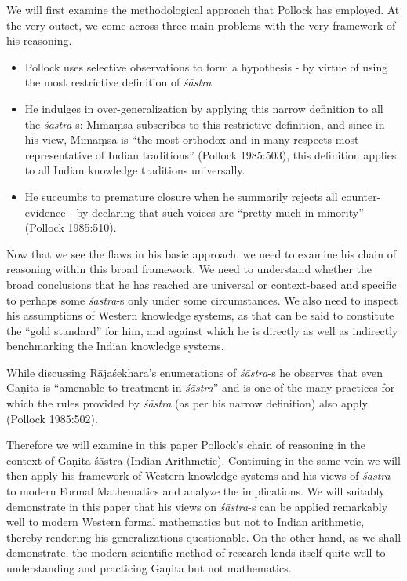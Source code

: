We will first examine the methodological approach that Pollock has employed. At the very outset, we come across three main problems with the very framework of his reasoning.
\begin{itemize}
\item Pollock uses selective observations to form a hypothesis - by virtue of using the most restrictive definition of {\sl śāstra}.

\item He indulges in over-generalization by applying this narrow definition to all the {\sl śāstra}-s: Mīmāṃsā subscribes to this restrictive definition, and since in his view, Mīmāṃsā is ``the most orthodox and in many respects most representative of Indian traditions'' (Pollock 1985:503), this definition applies to all Indian knowledge traditions universally.

\item He succumbs to premature closure when he summarily rejects all counter-evidence - by declaring that such voices are ``pretty much in minority'' (Pollock 1985:510).
\end{itemize}

Now that we see the flaws in his basic approach, we need to examine his chain of reasoning within this broad framework. We need to understand whether the broad conclusions that he has reached are universal or context-based and specific to perhaps some {\sl śāstra}-s only under some circumstances.  We also need to inspect his assumptions of Western knowledge systems, as that can be said to constitute the ``gold standard'' for him, and against which he is directly as well as indirectly benchmarking the Indian knowledge systems.

While discussing Rājaśekhara’s enumerations of {\sl śāstra}-s he observes that even Gaṇita is ``amenable to treatment in {\sl śāstra}'' and is one of the many practices for which the rules provided by {\sl śāstra} (as per his narrow definition) also apply (Pollock 1985:502). 

Therefore we will examine in this paper Pollock’s chain of reasoning in the context of Gaṇita-śāstra (Indian Arithmetic). Continuing in the same vein we will then apply his framework of Western knowledge systems and his views of {\sl śāstra} to modern Formal Mathematics and analyze the implications. We will suitably demonstrate in this paper that his views on {\sl śāstra}-s can be applied remarkably well to modern Western formal mathematics but not to Indian arithmetic, thereby rendering his generalizations questionable. On the other hand, as we shall demonstrate, the modern scientific method of research lends itself quite well to understanding and practicing Gaṇita but not mathematics.

